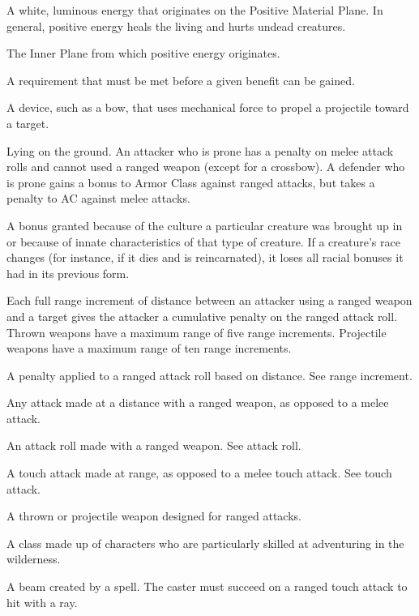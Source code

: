  A white, luminous energy that originates on the 
Positive Material Plane. In general, positive energy heals the living 
and hurts undead creatures. 

 The Inner Plane from which positive 
energy originates. 

 A requirement that must be met before a given 
benefit can be gained. 

 A device, such as a bow, that uses mechanical 
force to propel a projectile toward a target. 

 Lying on the ground. An attacker who is prone has a  
penalty on melee attack rolls and cannot used a ranged weapon 
(except for a crossbow). A defender who is prone gains a  bonus to 
Armor Class against ranged attacks, but takes a  penalty to AC 
against melee attacks. 

 A bonus granted because of the culture a particular 
creature was brought up in or because of innate characteristics of 
that type of creature. If a creature's race changes (for instance, if it 
dies and is reincarnated), it loses all racial bonuses it had in its 
previous form. 

 Each full range increment of distance between an attacker using a ranged weapon and a target gives the 
attacker a cumulative  penalty on the ranged attack roll. Thrown 
weapons have a maximum range of five range increments. Projectile 
weapons have a maximum range of ten range increments. 

 A penalty applied to a ranged attack roll based on 
distance. See range increment. 

 Any attack made at a distance with a ranged 
weapon, as opposed to a melee attack. 

 An attack roll made with a ranged weapon. 
See attack roll. 

 A touch attack made at range, as opposed 
to a melee touch attack. See touch attack. 

 A thrown or projectile weapon designed for 
ranged attacks. 

 A class made up of characters who are particularly 
skilled at adventuring in the wilderness. 

 A beam created by a spell. The caster must succeed on a 
ranged touch attack to hit with a ray. 

